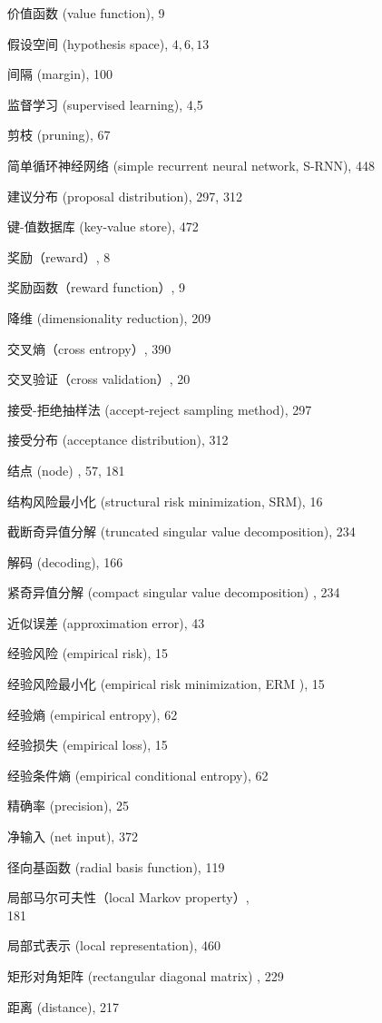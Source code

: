 \documentclass[10pt]{article}
\begin{document}
价值函数 (value function), 9

假设空间 (hypothesis space), $4,6,13$

间隔 (margin), 100

监督学习 (supervised learning), 4,5

剪枝 (pruning), 67

简单循环神经网络 (simple recurrent neural network, S-RNN), 448

建议分布 (proposal distribution), 297, 312

键-值数据库 (key-value store), 472

奖励（reward）, 8

奖励函数（reward function）, 9

降维 (dimensionality reduction), 209

交叉熵（cross entropy）, 390

交叉验证（cross validation）, 20

接受-拒绝抽样法 (accept-reject sampling method), 297

接受分布 (acceptance distribution), 312

结点 (node) , 57, 181

结构风险最小化 (structural risk minimization, SRM), 16

截断奇异值分解 (truncated singular value decomposition), 234

解码 (decoding), 166

紧奇异值分解 (compact singular value decomposition) , 234

近似误差 (approximation error), 43

经验风险 (empirical risk), 15

经验风险最小化 (empirical risk minimization, ERM ), 15

经验熵 (empirical entropy), 62

经验损失 (empirical loss), 15

经验条件熵 (empirical conditional entropy), 62

精确率 (precision), 25

净输入 (net input), 372

径向基函数 (radial basis function), 119

局部马尔可夫性（local Markov property）,\\
181

局部式表示 (local representation), 460

矩形对角矩阵 (rectangular diagonal matrix) , 229

距离 (distance), 217
\end{document}

